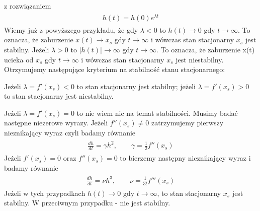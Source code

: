 \documentclass[a4paper,12pt,polish]{sphinxmanual}
\begin{document}
z rozwiązaniem
\label{ch1/chI023:equation-eqn15}\begin{gather}
\begin{split}h(t) = h(0)  e^{\lambda t}\end{split}\label{ch1/chI023-eqn15}
\end{gather}
Wiemy już z powyższego przykładu, że gdy $\lambda < 0$ to $h(t) \to 0$ gdy $t\to \infty$. To oznacza, że  zaburzenie $x(t) \to x_s$ gdy  $t \to \infty$  i wówczas stan stacjonarny $x_s$ jest stabilny.  Jeżeli  $\lambda > 0$ to $|h(t)| \to \infty$ gdy $t\to \infty$. To oznacza, że  zaburzenie x(t) ucieka od $x_s$ gdy  $t \to \infty$  i wówczas stan stacjonarny $x_s$ jest niestabilny. Otrzymujemy następujące kryterium na stabilność stanu stacjonarnego:

Jeżeli $\lambda = f'(x_s) < 0$ to  stan stacjonarny jest stabilny; jeżeli $\lambda = f'(x_s) > 0$ to  stan stacjonarny jest niestabilny.

Jeżeli $\lambda = f'(x_s) = 0$ to  nie wiem nic na temat stabilności. Musimy badać następne niezerowe wyrazy.  Jeżeli $f''(x_s) \ne 0$ zatrzymujemy pierwszy nieznikający wyraz czyli  badamy równanie
\label{ch1/chI023:equation-eqn16}\begin{gather}
\begin{split}\frac{dh}{dt} =\gamma h^2, \quad \quad \gamma  =  \frac{1}{2}f''(x_s)\end{split}\label{ch1/chI023-eqn16}
\end{gather}
Jeżeli  $f'(x_s) =0$ oraz $f''(x_s) =0$ to  bierzemy następny nieznikający wyraz i badamy równanie
\label{ch1/chI023:equation-eqn17}\begin{gather}
\begin{split} \frac{dh}{dt} =\nu h^3, \quad \quad \nu  =    \frac{1}{3!} f'''(x_s)\end{split}\label{ch1/chI023-eqn17}
\end{gather}
Jeżeli w tych przypadkach $h(t) \to 0$ gdy $t\to \infty$, to  stan stacjonarny $x_s$ jest stabilny. W przeciwnym przypadku  - nie jest stabilny.
\end{document}
